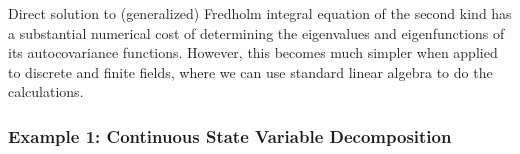 \documentclass[10pt]{article}
\newcommand{\norm}[1]{\left\Vert#1\right\Vert}
\begin{document}
%
Direct solution to (generalized) Fredholm integral equation of the second kind has a substantial numerical cost of determining the eigenvalues and eigenfunctions of its autocovariance functions.
However, this becomes much simpler when applied to discrete and finite fields, where we can use standard linear algebra to do the calculations.

\subsubsection{Example 1: Continuous State Variable Decomposition}
\end{document}

